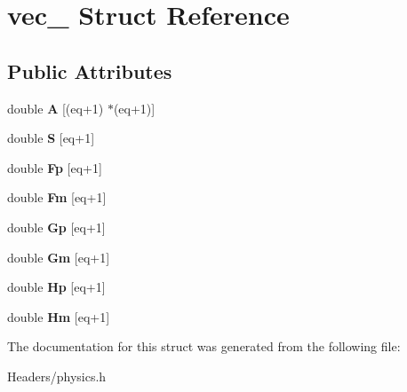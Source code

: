 \hypertarget{structvec__}{}\section{vec\+\_\+ Struct Reference}
\label{structvec__}
\subsection*{Public Attributes}
\begin{DoxyCompactItemize}
\item 
\mbox{\label{structvec___abba58f1bf461796a272cd74533446e81}} 
double {\bfseries A} \mbox{[}(eq+1) $\ast$(eq+1)\mbox{]}
\item 
\mbox{\label{structvec___af0d36a2478a5b41460ac10e7a1a57f66}} 
double {\bfseries S} \mbox{[}eq+1\mbox{]}
\item 
\mbox{\label{structvec___a137c1d767713c78e59cd10cd6d1c43d3}} 
double {\bfseries Fp} \mbox{[}eq+1\mbox{]}
\item 
\mbox{\label{structvec___a39a3d444889d53dfcad2354dde7650a1}} 
double {\bfseries Fm} \mbox{[}eq+1\mbox{]}
\item 
\mbox{\label{structvec___aaaf67beb923feaa8ebcf314cf64490e4}} 
double {\bfseries Gp} \mbox{[}eq+1\mbox{]}
\item 
\mbox{\label{structvec___abba08369cff4b2716bdcac8c3285943a}} 
double {\bfseries Gm} \mbox{[}eq+1\mbox{]}
\item 
\mbox{\label{structvec___aad9f126e4f6be5fedcd0ee91e4c37fcc}} 
double {\bfseries Hp} \mbox{[}eq+1\mbox{]}
\item 
\mbox{\label{structvec___a58e954d13bba5353ec952b7c2eb11e4b}} 
double {\bfseries Hm} \mbox{[}eq+1\mbox{]}
\end{DoxyCompactItemize}


The documentation for this struct was generated from the following file\+:\begin{DoxyCompactItemize}
\item 
Headers/physics.\+h\end{DoxyCompactItemize}
